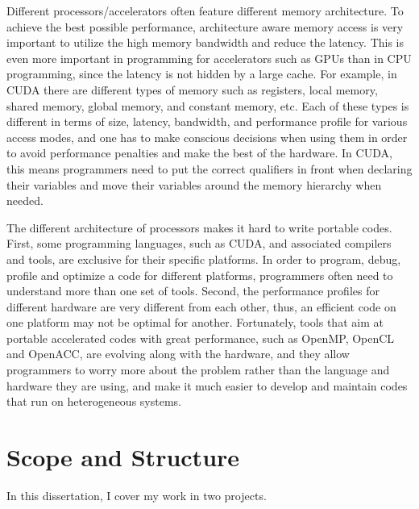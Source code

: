 Different processors/accelerators often feature different memory architecture.
To achieve the best possible performance, architecture aware memory access is 
very important to utilize the high memory bandwidth and reduce the latency.
This is even more important in programming for accelerators such as GPUs than in
CPU programming, since the latency is not hidden by a large cache.
For example, in CUDA %
there are different types of memory such as registers, local memory, shared 
memory, global memory, and constant memory, etc. Each of these types is 
different in terms of size, latency, bandwidth, and performance profile for 
various access modes, and one has to make conscious decisions when using them
in order to avoid performance penalties and make the best of the hardware. 
In CUDA, this means programmers need to put the correct qualifiers in front when 
declaring their variables and move their variables around the memory hierarchy 
when needed.
 

The different architecture of processors makes it hard to write portable codes.
First, some programming languages, such as CUDA, and associated compilers and tools,
 are exclusive for their specific platforms. In order to program, debug, profile 
and optimize a code for different platforms, programmers often need to understand 
more than one set of tools. 
Second, the performance profiles for different hardware are very
different from each other, thus, an efficient code on one platform may not be
optimal for another. 
Fortunately, tools that aim at portable accelerated codes with great performance, such as 
OpenMP\cite{dagum1998openmp}, OpenCL\cite{Stone:2010:OPP:622179.1803953} and OpenACC\cite{OpenACC}, are evolving along with the hardware, and they allow programmers
to worry more about the problem rather than the language and hardware they are
using, and make it much easier to develop and maintain codes that run on heterogeneous systems.





\section{Scope and Structure}
In this dissertation, I cover my work in two projects.

